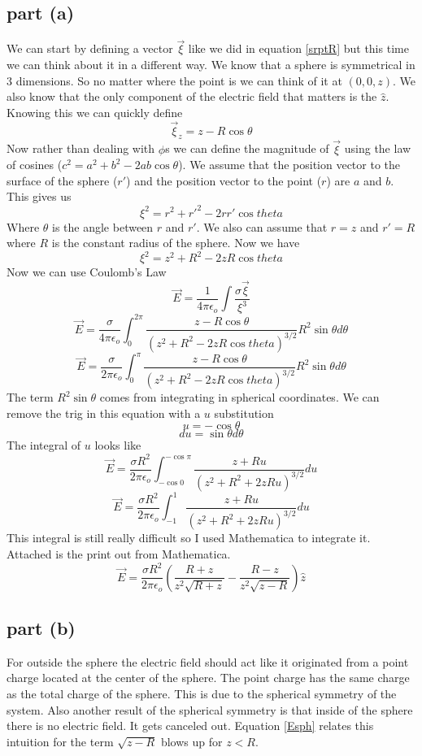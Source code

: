\documentclass[11pt]{article}
\numberwithin{equation}{section}
\begin{document}
\subsection{part (a)}
We can start by defining a vector $\vec{\xi}$ like we did in equation \ref{srptR} but this time we can think about it in a different way. We know that a sphere is symmetrical in 3 dimensions. So no matter where the point is we can think of it at $(0,0,z)$. We also know that the only component of the electric field that matters is the $\hat{z}$. Knowing this we can quickly define 
$$\vec{\xi}_z = z - R\cos{\theta}$$
Now rather than dealing with $\phi$s we can define the magnitude of $\vec{\xi}$ using the law of cosines ($c^2 = a^2 + b^2 - 2ab\cos{\theta}$). We assume that the position vector to the surface of the sphere ($r'$) and the position vector to the point ($r$) are $a$ and $b$. This gives us
$$\xi^2 = r^2 + r'^2 - 2 r r' \cos{theta}$$
Where $\theta$ is the angle between $r$ and $r'$. We also can assume that $r = z$ and $r' = R$ where $R$ is the constant radius of the sphere. Now we have
$$\xi^2 = z^2 + R^2 - 2 z R  \cos{theta}$$
Now we can use Coulomb's Law 
$$\vec{E} = \frac{1}{4\pi\epsilon_o}\int \frac{\sigma\vec{\xi}}{\xi^3}$$
$$\vec{E} = \frac{\sigma}{4\pi\epsilon_o}\int_{0}^{2\pi} \frac{z - R\cos{\theta}}{(z^2 + R^2 - 2 z R  \cos{theta})^{3/2}} R^2 \sin{\theta} d\theta$$
$$\vec{E} = \frac{\sigma}{2\pi\epsilon_o}\int_{0}^{\pi} \frac{z - R\cos{\theta}}{(z^2 + R^2 - 2 z R  \cos{theta})^{3/2}} R^2 \sin{\theta} d\theta$$
The term $R^2\sin{\theta}$ comes from integrating in spherical coordinates. We can remove the trig in this equation with a $u$ substitution
$$u = -\cos{\theta}$$
$$du = \sin{\theta}d\theta$$
The integral of $u$ looks like
$$\vec{E} = \frac{\sigma R^2}{2\pi\epsilon_o}\int_{-\cos{0}}^{-\cos{\pi}} \frac{z + Ru}{(z^2 + R^2 + 2 z R u)^{3/2}} du$$
$$\vec{E} = \frac{\sigma R^2}{2\pi\epsilon_o}\int_{-1}^{1} \frac{z + Ru}{(z^2 + R^2 + 2 z R u)^{3/2}} du$$
This integral is still really difficult so I used Mathematica to integrate it. Attached is the print out from Mathematica.
\begin{equation}
\vec{E} = \frac{\sigma R^2}{2\pi\epsilon_o}\left(\frac{R + z}{z^2\sqrt{R+z}} - \frac{R -z}{z^2\sqrt{z - R}}\right) \hat{z}
\label{Esph}
\end{equation}


\subsection{part (b)}
For outside the sphere the electric field should act like it originated from a point charge located at the center of the sphere. The point charge has the same charge as the total charge of the sphere. This is due to the spherical symmetry of the system. Also another result of the spherical symmetry is that inside of the sphere there is no electric field. It gets canceled out. Equation \ref{Esph} relates this intuition for the term $\sqrt{z - R}$ blows up for $z < R$.
\end{document}
